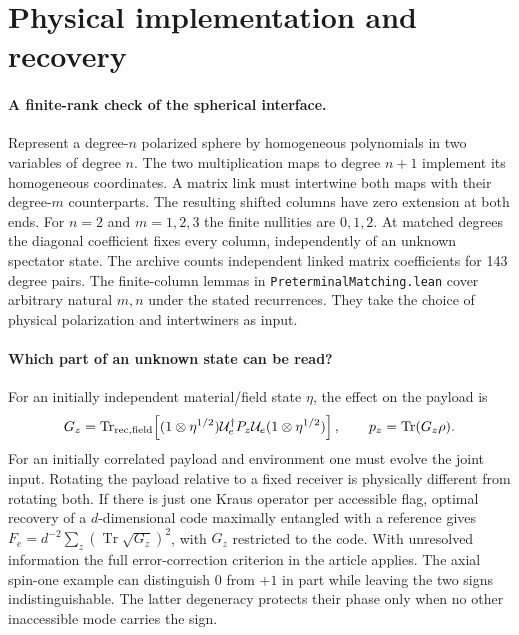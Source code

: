\documentclass[11pt,a4paper]{article}
\newcommand{\Tr}{\operatorname{Tr}}
\begin{document}
\section{Physical implementation and recovery}
\paragraph{A finite-rank check of the spherical interface.}
Represent a degree-\(n\) polarized sphere by homogeneous polynomials in two variables of degree \(n\). The two multiplication maps to degree \(n+1\) implement its homogeneous coordinates. A matrix link must intertwine both maps with their degree-\(m\) counterparts. The resulting shifted columns have zero extension at both ends. For \(n=2\) and \(m=1,2,3\) the finite nullities are \(0,1,2\). At matched degrees the diagonal coefficient fixes every column, independently of an unknown spectator state. The archive counts independent linked matrix coefficients for 143 degree pairs. The finite-column lemmas in \texttt{PreterminalMatching.lean} cover arbitrary natural \(m,n\) under the stated recurrences. They take the choice of physical polarization and intertwiners as input.

\paragraph{Which part of an unknown state can be read?}
For an initially independent material/field state \(\eta\), the effect on the payload is
\[
 G_z=\Tr_{\rm rec,field}\!\left[(1\otimes\eta^{1/2}){\cal U}_e^\dagger P_z{\cal U}_e
 (1\otimes\eta^{1/2})\right],\qquad p_z=\Tr(G_z\rho).
\]
For an initially correlated payload and environment one must evolve the joint input. Rotating the payload relative to a fixed receiver is physically different from rotating both. If there is just one Kraus operator per accessible flag, optimal recovery of a \(d\)-dimensional code maximally entangled with a reference gives \(F_e=d^{-2}\sum_z(\Tr\sqrt{G_z})^2\), with \(G_z\) restricted to the code. With unresolved information the full error-correction criterion in the article applies. The axial spin-one example can distinguish \(0\) from \(+1\) in part while leaving the two signs indistinguishable. The latter degeneracy protects their phase only when no other inaccessible mode carries the sign.
\end{document}
